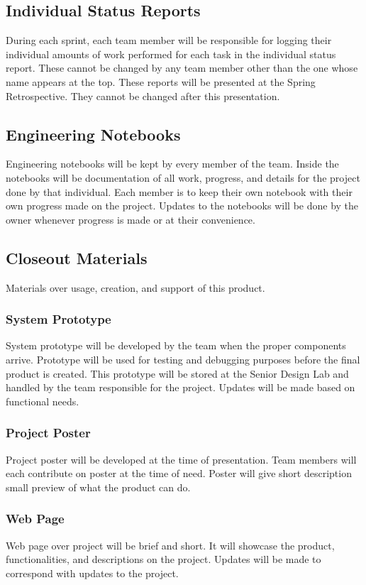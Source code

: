 \subsection{Individual Status Reports}
During each sprint, each team member will be responsible for logging their individual amounts of work performed for each task in the individual status report. These cannot be changed by any team member other than the one whose name appears at the top. These reports will be presented at the Spring Retrospective. They cannot be changed after this presentation.

\subsection{Engineering Notebooks}
Engineering notebooks will be kept by every member of the team. Inside the notebooks will be documentation of all work, progress, and details for the project done by that individual. Each member is to keep their own notebook with their own progress made on the project. Updates to the notebooks will be done by the owner whenever progress is made or at their convenience.   

\subsection{Closeout Materials}
Materials over usage, creation, and support of this product.

\subsubsection{System Prototype}
System prototype will be developed by the team when the proper components arrive. Prototype will be used for testing and debugging purposes before the final product is created. This prototype will be stored at the Senior Design Lab and handled by the team responsible for the project. Updates will be made based on functional needs. 

\subsubsection{Project Poster}
Project poster will be developed at the time of presentation. Team members will each contribute on poster at the time of need. Poster will give short description small preview of what the product can do. 

\subsubsection{Web Page}
Web page over project will be brief and short. It will showcase the product, functionalities, and descriptions on the project. Updates will be made to correspond with updates to the project.


